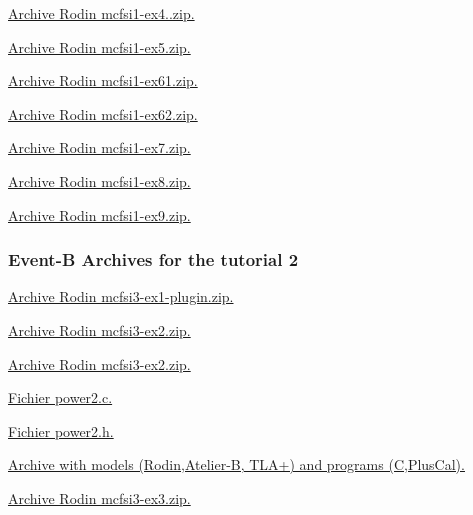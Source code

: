 \documentclass[ 12pt]{article}
\begin{document}
\href{http://mery54.github.io/teaching/mosos/models/mcfsi1-ex4.zip}{Archive
  Rodin   mcfsi1-ex4..zip.}

\href{http://mery54.github.io/teaching/mosos/models/mcfsi1-ex5.zip}{Archive
  Rodin   mcfsi1-ex5.zip.}

\href{http://mery54.github.io/teaching/mosos/models/mcfsi1-ex61.zip}{Archive
  Rodin   mcfsi1-ex61.zip.}

\href{http://mery54.github.io/teaching/mosos/models/mcfsi1-ex62.zip}{Archive
  Rodin   mcfsi1-ex62.zip.}

\href{http://mery54.github.io/teaching/mosos/models/mcfsi1-ex7.zip}{Archive
  Rodin   mcfsi1-ex7.zip.}

\href{http://mery54.github.io/teaching/mosos/models/mcfsi1-ex8.zip}{Archive
  Rodin   mcfsi1-ex8.zip.}




\href{http://mery54.github.io/teaching/mosos/models/mcfsi1-ex9.zip}{Archive
  Rodin   mcfsi1-ex9.zip.}







 \subsubsection{Event-B Archives for   the tutorial 2}
\label{sec:event-b-archives}





\href{http://mery54.github.io/teaching/mosos/models/mcfsi3-ex1-plugin.zip}{Archive 
  Rodin  mcfsi3-ex1-plugin.zip.}

\href{http://mery54.github.io/teaching/mosos/models/mcfsi3-ex2.zip}{Archive 
  Rodin  mcfsi3-ex2.zip.}

\href{http://mery54.github.io/teaching/mosos/models/mcfsi3-ex2-plugin.zip}{Archive 
  Rodin  mcfsi3-ex2.zip.}



\href{http://mery54.github.io/teaching/mosos/codes/power2.c}{Fichier 
  power2.c.}

\href{http://mery54.github.io/teaching/mosos/codes/power2.h}{Fichier 
  power2.h.}


\href{http://mery54.github.io/teaching/mosos/lemon/power2lit.zip}{Archive
   with   models (Rodin,Atelier-B, TLA+)   and programs (C,PlusCal).}






\href{http://mery54.github.io/teaching/mosos/models/mcfsi3-ex3.zip}{Archive 
  Rodin  mcfsi3-ex3.zip.}
\end{document}
